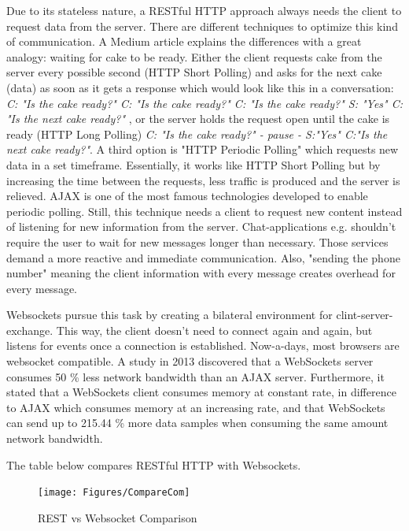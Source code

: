 Due to its stateless nature, a RESTful HTTP approach always needs the client to request data from the server.
There are different techniques to optimize this kind of communication. A Medium article
\parencite{comSummary} explains the differences with a great analogy: waiting for cake to be ready.
Either the client requests cake from the server every possible second (HTTP Short Polling) and asks for the next cake (data) as soon as it gets a response which would look like this in a conversation: 
\textit{ C: "Is the cake ready?" C: "Is the cake ready?" C: "Is the cake ready?" S: "Yes" C: "Is the next cake ready?"} ,
or the server holds the request open until the cake is ready (HTTP Long Polling) \textit{C: "Is the cake ready?" - pause -  S:"Yes" C:"Is the next cake ready?"}.
A third option is "HTTP Periodic Polling" which requests new data in a set timeframe. 
Essentially, it works like HTTP Short Polling but by increasing the time between the requests, less traffic is produced and the server is relieved.
AJAX \parencite{ajax} is one of the most famous technologies developed to enable periodic polling.
Still, this technique needs a client to request new content instead of listening 
for new information from the server. 
Chat-applications e.g. shouldn't require the user to wait for new messages longer than necessary.
Those services demand a more reactive and immediate communication.
Also, "sending the phone number" meaning the client information with every message creates overhead for every message.

Websockets pursue this task by creating a bilateral environment for clint-server-exchange. 
This way, the client doesn't need to connect again and again, but listens for events once a connection is established.
Now-a-days, most browsers are websocket compatible.
A study in 2013  \parencite{comAJAXvsWeb} discovered that a WebSockets server consumes 50 \% 
less network bandwidth than an AJAX server.
Furthermore, it stated that a WebSockets client consumes memory at constant rate, 
in difference to AJAX which consumes memory at an increasing rate, and that WebSockets can send up to 215.44 \% 
more data samples when consuming the same amount network bandwidth.

The table below compares RESTful HTTP with Websockets. 

\begin{figure}[b]
	\centering
    \texttt{[image: Figures/CompareCom]}
	\decoRule
	\caption[Communication Comparison]{REST vs Websocket Comparison}
	\label{fig:CompareCom}
\end{figure}

